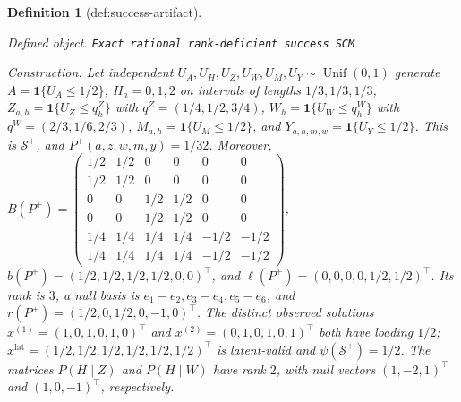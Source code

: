 \documentclass{article}
\newtheorem{definition}{Definition}
\begin{document}
\begin{definition}[def:success-artifact]\label{def:success-artifact}
\par\smallskip\noindent\emph{Defined object.} \texttt{Exact rational rank-\allowbreak{}deficient success SCM}
\par\smallskip\noindent\emph{Construction.} Let independent \(U_A,U_H,U_Z,U_W,U_M,U_Y\sim\operatorname{Unif}(0,1)\) generate \(A=\mathbf 1\{U_A\le1/2\}\), \(H_a=0,1,2\) on intervals of lengths \(1/3,1/3,1/3\), \(Z_{a,h}=\mathbf 1\{U_Z\le q_h^Z\}\) with \(q^Z=(1/4,1/2,3/4)\), \(W_h=\mathbf 1\{U_W\le q_h^W\}\) with \(q^W=(2/3,1/6,2/3)\), \(M_{a,h}=\mathbf 1\{U_M\le1/2\}\), and \(Y_{a,h,m,w}=\mathbf 1\{U_Y\le1/2\}\). This is \(\mathcal S^+\), and \(P^+(a,z,w,m,y)=1/32\). Moreover, \(B(P^+)=\begin{pmatrix}1/2&1/2&0&0&0&0\\1/2&1/2&0&0&0&0\\0&0&1/2&1/2&0&0\\0&0&1/2&1/2&0&0\\1/4&1/4&1/4&1/4&-1/2&-1/2\\1/4&1/4&1/4&1/4&-1/2&-1/2\end{pmatrix}\), \(b(P^+)=(1/2,1/2,1/2,1/2,0,0)^{\top}\), and \(\ell(P^+)=(0,0,0,0,1/2,1/2)^{\top}\). Its rank is \(3\), a null basis is \(e_1-e_2,e_3-e_4,e_5-e_6\), and \(r(P^+)=(1/2,0,1/2,0,-1,0)^{\top}\). The distinct observed solutions \(x^{(1)}=(1,0,1,0,1,0)^{\top}\) and \(x^{(2)}=(0,1,0,1,0,1)^{\top}\) both have loading \(1/2\); \(x^{\mathrm{lat}}=(1/2,1/2,1/2,1/2,1/2,1/2)^{\top}\) is latent-valid and \(\psi(\mathcal S^+)=1/2\). The matrices \(P(H\mid Z)\) and \(P(H\mid W)\) have rank \(2\), with null vectors \((1,-2,1)^{\top}\) and \((1,0,-1)^{\top}\), respectively.
\end{definition}
\end{document}
